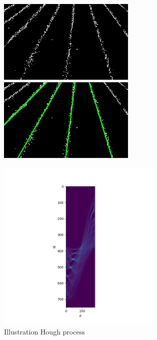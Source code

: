 \begin{figure}[H]
\begin{minipage}{0.5\columnwidth}
\includegraphics[width=\columnwidth,height=4cm]{Report/images/ImageProcesses/HoughProcess/VegeMask.png}
\\[3mm]
\includegraphics[width=\columnwidth,height=4cm]{Report/images/ImageProcesses/HoughProcess/HoughLineDrawned.png}
\captionsetup{justification=centering}
\end{minipage}
\hspace{1cm}
\begin{minipage}{0.8\columnwidth}
\includegraphics[width=\columnwidth,height=83mm]{Report/images/ImageProcesses/HoughProcess/HoughAcc.png}
\captionsetup{justification=centering}

\end{minipage}
\hspace{1cm}
\caption{Illustration Hough process}        
\label{fig:HOUGHTRANS}

\end{figure}



